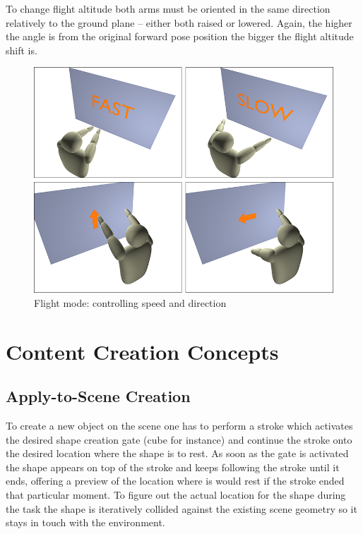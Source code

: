 To change flight altitude both arms must be oriented in the same direction relatively to the ground plane
-- either both raised or lowered. Again, the higher the angle is from the original forward pose position
the bigger the flight altitude shift is.

\begin{figure}[ht]
	\centering
		\includegraphics[scale=0.3]{gfx/flight.png}
	\caption{Flight mode: controlling speed and direction}
	\label{fig:flight}
\end{figure}



\section{Content Creation Concepts}

\subsection{Apply-to-Scene Creation}
\label{design:apply-to-scene}

To create a new object on the scene one has to perform a stroke which activates the desired shape creation gate (cube for instance)
and continue the stroke onto the desired location where the shape is to rest. As soon as the gate is activated the shape appears
on top of the stroke and keeps following the stroke until it ends, offering a preview of the location where is would rest
if the stroke ended that particular moment.
To figure out the actual location for the shape during the task the shape is iteratively collided against the
existing scene geometry so it stays in touch with the environment.

